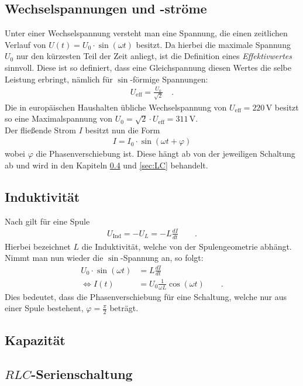\documentclass[12pt,a4paper,titlepage,headinclude,bibtotoc]{scrartcl}
\begin{document}
\subsection{Wechselspannungen und -ströme}
Unter einer Wechselspannung versteht man eine Spannung, die einen zeitlichen Verlauf von $U(t)= U_0\cdot\sin(\omega t)$ besitzt.
Da hierbei die maximale Spannung $U_0$ nur den kürzesten Teil der Zeit anliegt, ist die Definition eines \emph{Effektivwertes} sinnvoll.
Diese ist so definiert, dass eine Gleichspannung diesen Wertes die selbe Leistung erbringt, nämlich für $\sin$-förmige Spannungen:
\begin{align*}
U_\text{eff}=\frac{U_0}{\sqrt2}\quad .
\end{align*}
Die in europäischen Haushalten übliche Wechselspannung von $U_\text{eff}=220\,\si\volt$ besitzt so eine Maximalspannung von $U_0=\sqrt2\cdot U_\text{eff}=311\,\si\volt$.\\

Der fließende Strom $I$ besitzt nun die Form
\begin{align*}
I=I_0\cdot\sin(\omega t+\varphi)
\end{align*}
wobei $\varphi$ die Phasenverschiebung ist.
Diese hängt ab von der jeweiligen Schaltung ab und wird in den Kapiteln \ref{sec:RLC} und \ref{sec:LC} behandelt.

\subsection{Induktivität}
Nach \cite[S. 313]{griffith} gilt für eine Spule
\begin{align}
U_\text{Ind}=-U_L=-L\frac{dI}{dt}\qquad .
\end{align}
Hierbei bezeichnet $L$ die Induktivität, welche von der Spulengeometrie abhängt.
Nimmt man nun wieder die $\sin$-Spannung an, so folgt:
\begin{align*}
U_0\cdot\sin(\omega t)&=L\frac{dI}{dt}\\
\Leftrightarrow I(t)&=U_0\frac{1}{\omega L}\cos(\omega t)\qquad .
\end{align*}
Dies bedeutet, dass die Phasenverschiebung für eine Schaltung, welche nur aus einer Spule bestehent, $\varphi=\frac{\pi}{2}$ beträgt.


\subsection{Kapazität}

\subsection{$RLC$-Serienschaltung}
\label{sec:RLC}
\end{document}
